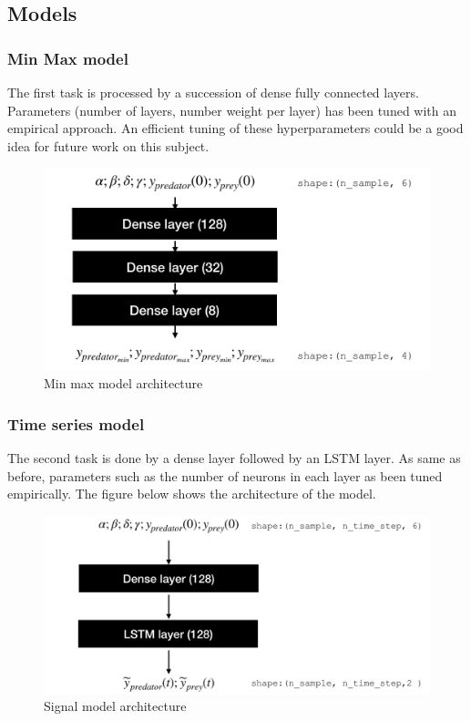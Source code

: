\documentclass{article}
\begin{document}
\subsection{Models}
\subsubsection{Min Max model }

The first task is processed by a succession of dense fully connected layers. Parameters (number of layers, number weight per layer) has been tuned with an empirical approach. An efficient tuning of these hyperparameters could be a good idea for future work on this subject.  


\begin{figure}[H]
\centering
\includegraphics[scale=0.4]{image/min_max_model.png}
\caption{Min max model architecture}
\label{fig: Two models}
\end{figure}

\subsubsection{Time series model}

The second task is done by a dense layer followed by an LSTM layer. As same as before, parameters such as the number of neurons in each layer as been tuned empirically. The figure below shows the architecture of the model.   

\begin{figure}[H]
\centering
\includegraphics[scale=0.4]{image/signal_model.png}
\caption{Signal model architecture}
\label{fig: Signal model}
\end{figure}
\end{document}
